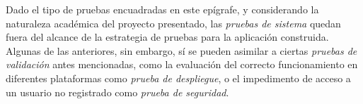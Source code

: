 Dado el tipo de pruebas encuadradas en este epígrafe, y considerando la naturaleza académica del proyecto presentado, las \emph{pruebas de sistema} quedan fuera del alcance de la estrategia de pruebas para la aplicación construida. Algunas de las anteriores, sin embargo, sí se pueden asimilar a ciertas \emph{pruebas de validación} antes mencionadas, como la evaluación del correcto funcionamiento en diferentes plataformas como \emph{prueba de despliegue}, o el impedimento de acceso a un usuario no registrado como \emph{prueba de seguridad}.